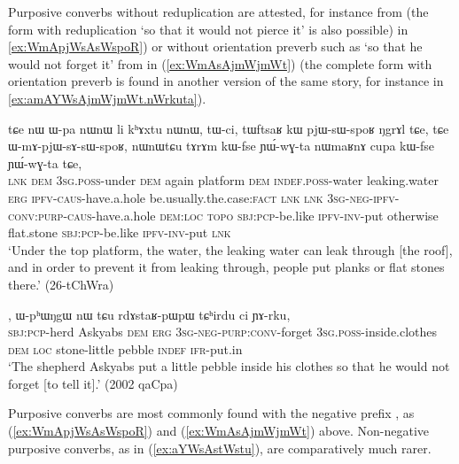 Purposive converbs without reduplication are attested, for instance  from  (the form with reduplication  `so that it would not pierce it' is also possible) in \ref{ex:WmApjWsAsWspoR}) or without orientation preverb such as  `so that he would not forget it' from  in (\ref{ex:WmAsAjmWjmWt}) (the complete form with orientation preverb is found in another version of the same story, for instance in \ref{ex:amAYWsAjmWjmWt.nWrkuta}).


\begin{exe}
\ex \label{ex:WmApjWsAsWspoR}
\gll  tɕe nɯ ɯ-pa nɯnɯ li kʰɤxtu nɯnɯ, tɯ-ci, tɯftsaʁ kɯ pjɯ-sɯ-spoʁ ŋgrɤl tɕe, tɕe ɯ-mɤ-pjɯ-sɤ-sɯ-spoʁ, nɯnɯtɕu tɤrɤm kɯ-fse ɲɯ́-wɣ-ta nɯmaʁnɤ cupa kɯ-fse ɲɯ́-wɣ-ta tɕe, \\
\textsc{lnk} \textsc{dem} \textsc{3sg}.\textsc{poss}-under \textsc{dem} again platform \textsc{dem} \textsc{indef}.\textsc{poss}-water leaking.water \textsc{erg} \textsc{ipfv}-\textsc{caus}-have.a.hole be.usually.the.case:\textsc{fact} \textsc{lnk} \textsc{lnk} \textsc{3sg}-\textsc{neg}-\textsc{ipfv}-\textsc{conv}:\textsc{purp}-\textsc{caus}-have.a.hole \textsc{dem}:\textsc{loc}  \textsc{topo} \textsc{sbj}:\textsc{pcp}-be.like \textsc{ipfv}-\textsc{inv}-put otherwise  flat.stone \textsc{sbj}:\textsc{pcp}-be.like \textsc{ipfv}-\textsc{inv}-put \textsc{lnk} \\
\glt `Under the top platform, the water, the leaking water can leak through [the roof], and in order to prevent it from leaking through, people put planks or flat stones there.' (26-tChWra)
\end{exe}

\begin{exe}
\ex \label{ex:WmAsAjmWjmWt}
, ɯ-pʰɯŋgɯ nɯ tɕu rdɤstaʁ-pɯpɯ tɕʰirdu ci ɲɤ-rku, \\
 \textsc{sbj}:\textsc{pcp}-herd Askyabs \textsc{dem} \textsc{erg}  \textsc{3sg}-\textsc{neg}-\textsc{purp}:\textsc{conv}-forget \textsc{3sg}.\textsc{poss}-inside.clothes \textsc{dem} \textsc{loc} stone-little pebble \textsc{indef}
 \textsc{ifr}-put.in\\
\glt `The shepherd Askyabs put a little pebble inside his clothes so that he would not forget [to tell it].' (2002 qaCpa)
\end{exe}

Purposive converbs are most commonly found with the negative prefix , as (\ref{ex:WmApjWsAsWspoR}) and (\ref{ex:WmAsAjmWjmWt}) above. Non-negative purposive converbs, as in (\ref{ex:aYWsAstWstu}), are comparatively much rarer.

